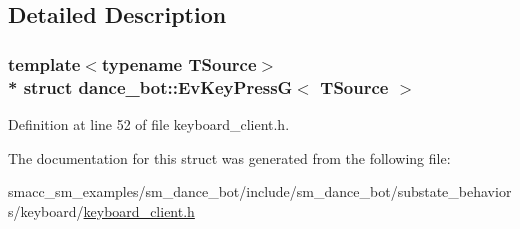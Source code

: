 \subsection{Detailed Description}
\subsubsection*{template$<$typename T\+Source$>$\\*
struct dance\+\_\+bot\+::\+Ev\+Key\+Press\+G$<$ T\+Source $>$}



Definition at line 52 of file keyboard\+\_\+client.\+h.



The documentation for this struct was generated from the following file\+:\begin{DoxyCompactItemize}
\item 
smacc\+\_\+sm\+\_\+examples/sm\+\_\+dance\+\_\+bot/include/sm\+\_\+dance\+\_\+bot/substate\+\_\+behaviors/keyboard/\hyperlink{keyboard__client_8h}{keyboard\+\_\+client.\+h}\end{DoxyCompactItemize}
